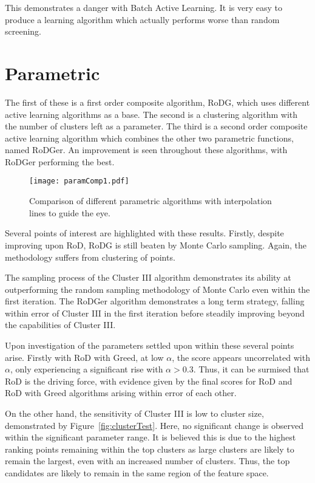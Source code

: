 This demonstrates a danger with Batch Active Learning. It is very easy to produce a learning algorithm which actually performs worse than random screening.

\section{Parametric}
The first of these is a first order composite algorithm, RoDG, which uses different active learning algorithms as a base. The second is a clustering algorithm with the number of clusters left as a parameter. The third is a second order composite active learning algorithm which combines the other two parametric functions, named RoDGer. An improvement is seen throughout these algorithms, with RoDGer performing the best.

\begin{figure}[H]
    \begin{center}
        \texttt{[image: paramComp1.pdf]}
        \caption[Parametric Comparison]{Comparison of different parametric algorithms with interpolation lines to guide the eye.}
        \label{fig:pComp}
    \end{center}
\end{figure}

Several points of interest are highlighted with these results. Firstly, despite improving upon RoD, RoDG is still beaten by Monte Carlo sampling. Again, the methodology suffers from clustering of points.

The sampling process of the Cluster III algorithm demonstrates its ability at outperforming the random sampling methodology of Monte Carlo even within the first iteration. The RoDGer algorithm demonstrates a long term strategy, falling within error of Cluster III in the first iteration before steadily improving beyond the capabilities of Cluster III.

Upon investigation of the parameters settled upon within these several points arise. Firstly with RoD with Greed, at low $\alpha$, the score appears uncorrelated with $\alpha$, only experiencing a significant rise with $\alpha{}>0.3$. Thus, it can be surmised that RoD is the driving force, with evidence given by the final scores for RoD and RoD with Greed algorithms arising within error of each other.

On the other hand, the sensitivity of Cluster III is low to cluster size, demonstrated by Figure~\ref{fig:clusterTest}. Here, no significant change is observed within the significant parameter range. It is believed this is due to the highest ranking points remaining within the top clusters as large clusters are likely to remain the largest, even with an increased number of clusters. Thus, the top candidates are likely to remain in the same region of the feature space.

